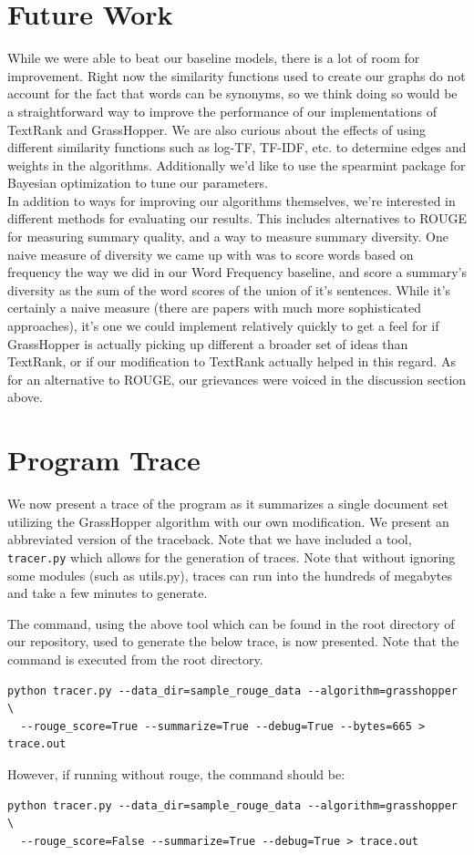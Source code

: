 \documentclass[10pt]{article}
\begin{document}
\section{Future Work}
While we were able to beat our baseline models, there is a lot of room for improvement. Right now the similarity functions used to create our graphs do not account for the fact that words can be synonyms, so we think doing so would be a straightforward way to improve the performance of our implementations of TextRank and GrassHopper. We are also curious about the effects of using different similarity functions such as log-TF, TF-IDF, etc. to determine edges and weights in the algorithms. Additionally we'd like to use the spearmint package for Bayesian optimization to tune our parameters. \\
In addition to ways for improving our algorithms themselves, we're interested in different methods for evaluating our results. This includes alternatives to ROUGE for measuring summary quality, and a way to measure summary diversity. One naive measure of diversity we came up with was to score words based on frequency the way we did in our Word Frequency baseline, and score a summary's diversity as the sum of the word scores of the union of it's sentences. While it's certainly a naive measure (there are papers with much more sophisticated approaches), it's one we could implement relatively quickly to get a feel for if GrassHopper is actually picking up different a broader set of ideas than TextRank, or if our modification to TextRank actually helped in this regard. As for an alternative to ROUGE, our grievances were voiced in the discussion section above.

\appendix

\section{Program Trace}
\label{sec:program_trace}

We now present a trace of the program as it summarizes a single document set utilizing the {\sc GrassHopper} algorithm with our own modification. We present an abbreviated version of the traceback. Note that we have included a tool, \verb|tracer.py| which allows for the generation of traces. Note that without ignoring some modules (such as utils.py), traces can run into the hundreds of megabytes and take a few minutes to generate.

The command, using the above tool which can be found in the root directory of our repository, used to generate the below trace, is now presented. Note that the command is executed from the root directory.
\begin{lstlisting}
python tracer.py --data_dir=sample_rouge_data --algorithm=grasshopper \
  --rouge_score=True --summarize=True --debug=True --bytes=665 > trace.out
\end{lstlisting}
However, if running without rouge, the command should be:
\begin{lstlisting}
python tracer.py --data_dir=sample_rouge_data --algorithm=grasshopper \
  --rouge_score=False --summarize=True --debug=True > trace.out
\end{lstlisting}
\end{document}
